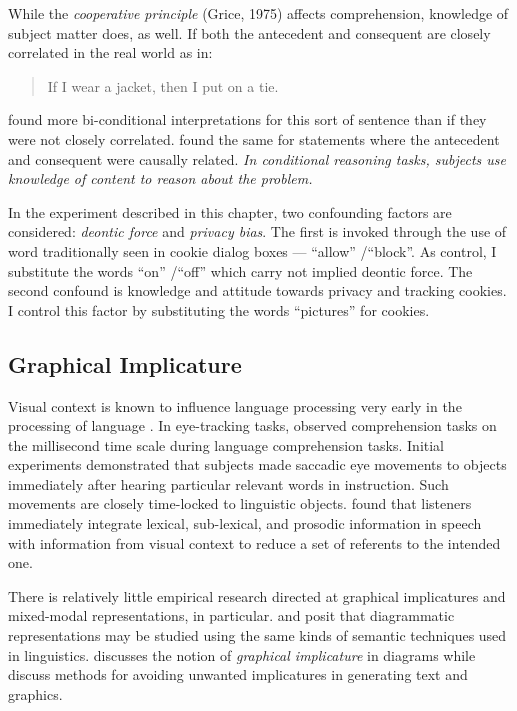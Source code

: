 While the \emph{cooperative principle} (Grice, 1975) affects comprehension, knowledge of subject matter does, as well. If both the antecedent and consequent are closely correlated in the real world as in:

\begin{quote}
If I wear a jacket, then I put on a tie.
\end{quote}

 \citet{politzer1981differences}  found more bi-conditional interpretations for this sort of sentence than if they were not closely correlated.  \citet{marcus:1979co}  found the same for statements where the antecedent and consequent were causally related. \emph{In conditional reasoning tasks, subjects use knowledge of content to reason about the problem.}

In the experiment described in this chapter, two confounding factors are considered: \emph{deontic force} and \emph{privacy bias}. The first is invoked through the use of word traditionally seen in cookie dialog boxes --- ``allow'' \slash  ``block''. As control, I substitute the words ``on'' \slash  ``off'' which carry not implied deontic force. The second confound is knowledge and attitude towards privacy and tracking cookies. I control this factor by substituting the words ``pictures'' for cookies.

\subsection{Graphical Implicature}
\label{graphicalimplicature}

Visual context is known to influence language processing very early in the processing of language  \citep{Tanenhaus:1995tc}.  In eye-tracking tasks,  \citet{Tanenhaus:1995tc}  observed comprehension tasks on the millisecond time scale during language comprehension tasks. Initial experiments demonstrated that subjects made saccadic eye movements to objects immediately after hearing particular relevant words in instruction. Such movements are closely time-locked to linguistic objects.  \citet{Eberhard:1995fa}  found that listeners immediately integrate lexical, sub-lexical, and prosodic information in speech with information from visual context to reduce a set of referents to the intended one. 

There is relatively little empirical research directed at graphical implicatures and mixed-modal representations, in particular.  \citet{Stenning:2006wu}  and  \citet{Stenning:1995ka}  posit that diagrammatic representations may be studied using the same kinds of semantic techniques used in linguistics.  \citet{Oberlander:1995vv}  discusses the notion of \emph{graphical implicature} in diagrams while  \citet{Marks:1990wh}  discuss methods for avoiding unwanted implicatures in generating text and graphics. 

